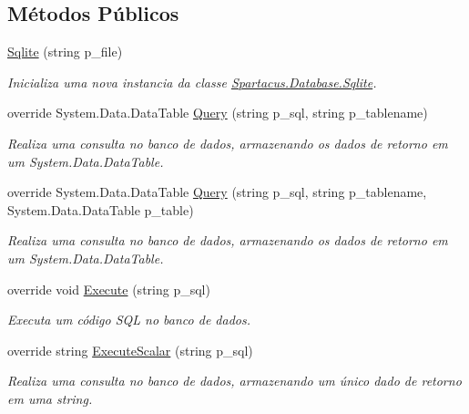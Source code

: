 \subsection*{Métodos Públicos}
\begin{DoxyCompactItemize}
\item 
\hyperlink{classSpartacus_1_1Database_1_1Sqlite_ac093bc658547c155306908a97e7e725d}{Sqlite} (string p\+\_\+file)
\begin{DoxyCompactList}\small\item\em Inicializa uma nova instancia da classe \hyperlink{classSpartacus_1_1Database_1_1Sqlite}{Spartacus.\+Database.\+Sqlite}. \end{DoxyCompactList}\item 
override System.\+Data.\+Data\+Table \hyperlink{classSpartacus_1_1Database_1_1Sqlite_a6b452dd40baf4fb82f3cf1dc2b5adef2}{Query} (string p\+\_\+sql, string p\+\_\+tablename)
\begin{DoxyCompactList}\small\item\em Realiza uma consulta no banco de dados, armazenando os dados de retorno em um System.\+Data.\+Data\+Table. \end{DoxyCompactList}\item 
override System.\+Data.\+Data\+Table \hyperlink{classSpartacus_1_1Database_1_1Sqlite_a935c96905011800e4df8ad0a7ca9bcf3}{Query} (string p\+\_\+sql, string p\+\_\+tablename, System.\+Data.\+Data\+Table p\+\_\+table)
\begin{DoxyCompactList}\small\item\em Realiza uma consulta no banco de dados, armazenando os dados de retorno em um System.\+Data.\+Data\+Table. \end{DoxyCompactList}\item 
override void \hyperlink{classSpartacus_1_1Database_1_1Sqlite_adb68d4ddb00d814f9741ec87e88d788a}{Execute} (string p\+\_\+sql)
\begin{DoxyCompactList}\small\item\em Executa um código S\+Q\+L no banco de dados. \end{DoxyCompactList}\item 
override string \hyperlink{classSpartacus_1_1Database_1_1Sqlite_a0f8931cb84b7c91dce7bd45089896d46}{Execute\+Scalar} (string p\+\_\+sql)
\begin{DoxyCompactList}\small\item\em Realiza uma consulta no banco de dados, armazenando um único dado de retorno em uma string. \end{DoxyCompactList}\end{DoxyCompactItemize}
